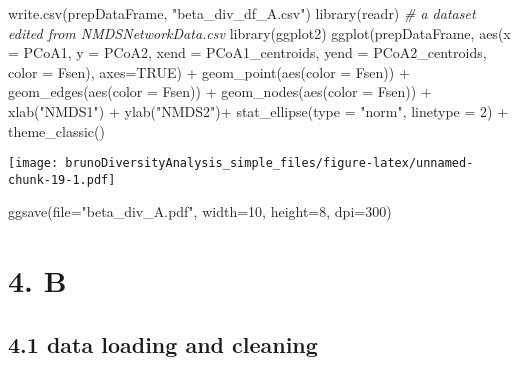 \documentclass[
]{article}
\newenvironment{Shaded}{\begin{snugshade}}{\end{snugshade}}
\newcommand{\AttributeTok}[1]{\textcolor[rgb]{0.77,0.63,0.00}{#1}}
\newcommand{\CommentTok}[1]{\textcolor[rgb]{0.56,0.35,0.01}{\textit{#1}}}
\newcommand{\ConstantTok}[1]{\textcolor[rgb]{0.00,0.00,0.00}{#1}}
\newcommand{\DecValTok}[1]{\textcolor[rgb]{0.00,0.00,0.81}{#1}}
\newcommand{\FunctionTok}[1]{\textcolor[rgb]{0.00,0.00,0.00}{#1}}
\newcommand{\NormalTok}[1]{#1}
\newcommand{\SpecialCharTok}[1]{\textcolor[rgb]{0.00,0.00,0.00}{#1}}
\newcommand{\StringTok}[1]{\textcolor[rgb]{0.31,0.60,0.02}{#1}}
\begin{document}
\begin{Shaded}
\begin{Highlighting}[]
\FunctionTok{write.csv}\NormalTok{(prepDataFrame, }\StringTok{"beta\_div\_df\_A.csv"}\NormalTok{)}
\FunctionTok{library}\NormalTok{(readr)}
\CommentTok{\# a dataset edited from NMDSNetworkData.csv}
\FunctionTok{library}\NormalTok{(ggplot2)}
\FunctionTok{ggplot}\NormalTok{(prepDataFrame, }\FunctionTok{aes}\NormalTok{(}\AttributeTok{x =}\NormalTok{ PCoA1, }\AttributeTok{y =}\NormalTok{ PCoA2, }\AttributeTok{xend =}\NormalTok{ PCoA1\_centroids, }\AttributeTok{yend =}\NormalTok{ PCoA2\_centroids, }\AttributeTok{color =}\NormalTok{ Fsen), }\AttributeTok{axes=}\ConstantTok{TRUE}\NormalTok{) }\SpecialCharTok{+}
  \FunctionTok{geom\_point}\NormalTok{(}\FunctionTok{aes}\NormalTok{(}\AttributeTok{color =}\NormalTok{ Fsen)) }\SpecialCharTok{+}
  \FunctionTok{geom\_edges}\NormalTok{(}\FunctionTok{aes}\NormalTok{(}\AttributeTok{color =}\NormalTok{ Fsen)) }\SpecialCharTok{+}
  \FunctionTok{geom\_nodes}\NormalTok{(}\FunctionTok{aes}\NormalTok{(}\AttributeTok{color =}\NormalTok{ Fsen)) }\SpecialCharTok{+}
  \FunctionTok{xlab}\NormalTok{(}\StringTok{"NMDS1"}\NormalTok{) }\SpecialCharTok{+}
  \FunctionTok{ylab}\NormalTok{(}\StringTok{"NMDS2"}\NormalTok{)}\SpecialCharTok{+}
  \FunctionTok{stat\_ellipse}\NormalTok{(}\AttributeTok{type =} \StringTok{"norm"}\NormalTok{, }\AttributeTok{linetype =} \DecValTok{2}\NormalTok{) }\SpecialCharTok{+}
  \FunctionTok{theme\_classic}\NormalTok{()}
\end{Highlighting}
\end{Shaded}

\texttt{[image: brunoDiversityAnalysis\_simple\_files/figure-latex/unnamed-chunk-19-1.pdf]}

\begin{Shaded}
\begin{Highlighting}[]
\FunctionTok{ggsave}\NormalTok{(}\AttributeTok{file=}\StringTok{"beta\_div\_A.pdf"}\NormalTok{, }\AttributeTok{width=}\DecValTok{10}\NormalTok{, }\AttributeTok{height=}\DecValTok{8}\NormalTok{, }\AttributeTok{dpi=}\DecValTok{300}\NormalTok{)}
\end{Highlighting}
\end{Shaded}

\hypertarget{b}{%
\section{4. B}\label{b}}

\hypertarget{data-loading-and-cleaning-3}{%
\subsection{4.1 data loading and
cleaning}\label{data-loading-and-cleaning-3}}
\end{document}
